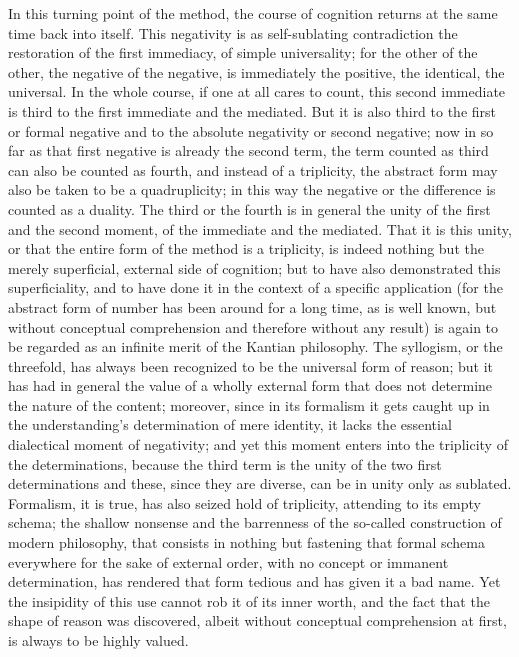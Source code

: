 In this turning point of the method,
the course of cognition returns at the
same time back into itself.
This negativity is as self-sublating contradiction
the restoration of the first immediacy, of simple universality;
for the other of the other, the negative of the negative,
is immediately the positive, the identical, the universal.
In the whole course, if one at all cares to count,
this second immediate is third to the first immediate and the mediated.
But it is also third to the first or formal negative
and to the absolute negativity or second negative;
now in so far as that first negative is already the second
term, the term counted as third can also be counted as fourth,
and instead of a triplicity, the abstract form may also be taken to be a quadruplicity;
in this way the negative or the difference is counted as a duality.
The third or the fourth is in general
the unity of the first and the second moment,
of the immediate and the mediated.
That it is this unity,
or that the entire form
of the method is a triplicity,
is indeed nothing but the merely superficial,
external side of cognition;
 but to have also demonstrated this superficiality,
and to have done it in the context of a specific application (for the abstract
form of number has been around for a long time, as is well known, but
without conceptual comprehension and therefore without any result) is
again to be regarded as an infinite merit of the Kantian philosophy.
The syllogism, or the threefold, has always been recognized to be the universal
form of reason;
but it has had in general the value of a wholly external form
that does not determine the nature of the content;
moreover, since in its formalism it gets caught up
in the understanding's determination of mere identity,
it lacks the essential dialectical moment of negativity;
and yet this moment enters into the triplicity of the determinations,
because the third term is the unity of the two first determinations
and these, since they are diverse, can be in unity only as sublated.
Formalism, it is true, has also
seized hold of triplicity, attending to its empty schema;
the shallow nonsense and the barrenness of the so-called construction of modern philosophy, that
consists in nothing but fastening that formal schema everywhere for the
sake of external order,
with no concept or immanent determination,
has rendered that form tedious and has given it a bad name.
Yet the insipidity of this use cannot rob it of its inner worth,
and the fact that the shape of reason was discovered,
albeit without conceptual comprehension at first,
is always to be highly valued.


